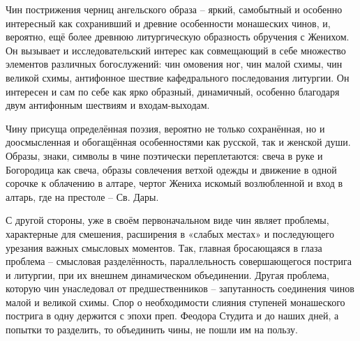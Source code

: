 
\Conclusion %

Чин пострижения черниц ангельского образа -- яркий, самобытный и особенно интересный как сохранивший и древние особенности монашеских чинов, и, вероятно, ещё более древнюю литургическую образность обручения с Женихом.
Он вызывает и исследовательский интерес как совмещающий в себе множество элементов различных богослужений: чин омовения ног, чин малой схимы, чин великой схимы, антифонное шествие кафедрального последования литургии.
Он интересен и сам по себе как ярко образный, динамичный, особенно благодаря двум антифонным шествиям и входам-выходам.

Чину присуща определённая поэзия, вероятно не только сохранённая, но и доосмысленная и обогащённая особенностями как русской, так и женской души.
Образы, знаки, символы в чине поэтически переплетаются: свеча в руке и Богородица как свеча, образы совлечения ветхой одежды и движение в одной сорочке к облачению в алтаре, чертог Жениха искомый возлюбленной и вход в алтарь, где на престоле -- Св. Дары.

С другой стороны, уже в своём первоначальном виде чин являет проблемы, характерные для смешения, расширения в «слабых местах»\cite{taft.rastut.2009} и последующего урезания важных смысловых моментов.
Так, главная бросающаяся в глаза проблема -- смысловая разделённость, параллельность совершающегося пострига и литургии, при их внешнем динамическом объединении.
Другая проблема, которую чин унаследовал от предшественников -- запутанность соединения чинов малой и великой схимы.
Спор о необходимости слияния ступеней монашеского пострига в одну держится с эпохи преп. Феодора Студита и до наших дней, а попытки то разделить, то объединить чины, не пошли им на пользу.



